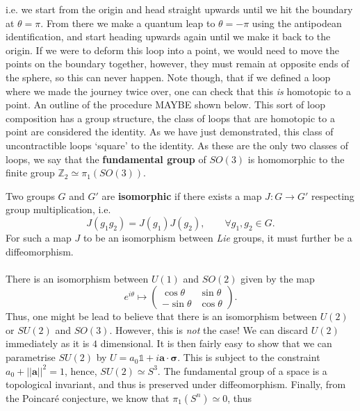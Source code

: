 \documentclass[11pt,fleqn]{article}
\begin{document}
i.e. we start from the origin and head straight upwards until we hit the boundary at $ \theta = \pi $. From there we make a quantum leap to $ \theta = -\pi $ using the antipodean identification, and start heading upwards again until we make it back to the origin. If we were to deform this loop into a point, we would need to move the points on the boundary together, however, they must remain at opposite ends of the sphere, so this can never happen. Note though, that if we defined a loop where we made the journey twice over, one can check that this \textit{is} homotopic to a point. An outline of the procedure MAYBE shown below. This sort of loop composition has a group structure, the class of loops that are homotopic to a point are considered the identity. As we have just demonstrated, this class of uncontractible loops `square' to the identity. As these are the only two classes of loops, we say that the \textbf{fundamental group} of $ SO(3) $ is homomorphic to the finite group $ \mathbb{Z}_2 \simeq \pi_1 \left( SO(3) \right) $.

\begin{definition}
	Two groups $ G $ and $ G' $ are \textbf{isomorphic} if there exists a map $ J: G \to G' $ respecting group multiplication, i.e.
		\begin{equation}
			J(g_1g_2) = J(g_1) J(g_2), \qquad \forall g_1, g_2 \in G.
		\end{equation}
	For such a map $ J $ to be an isomorphism between \textit{Lie} groups, it must further be a diffeomorphism.
\end{definition}

\paragraph{} There is an isomorphism between $ U(1) $ and $ SO(2) $ given by the map
	\begin{equation}\label{key}
		e^{i\theta} \mapsto \begin{pmatrix}
			\cos \theta & \sin \theta \\ -\sin \theta & \cos \theta
		\end{pmatrix}.
	\end{equation}
Thus, one might be lead to believe that there is an isomorphism between $ U(2) $ or $ SU(2) $ and $ SO(3) $. However, this is \textit{not} the case! We can discard $ U(2) $ immediately as it is $ 4 $ dimensional. It is then fairly easy to show that we can parametrise $ SU(2) $ by $ U = a_0 \mathds{1} + i \mathbf{a} \cdot \boldsymbol{\sigma} $. This is subject to the constraint $ a_0 + || \mathbf{a} ||^2 = 1 $, hence, $ SU(2) \simeq S^3 $. The fundamental group of a space is a topological invariant, and thus is preserved under diffeomorphism. Finally, from the Poincar\'e conjecture, we know that $ \pi_1 (S^n) \simeq 0 $, thus 
\end{document}
